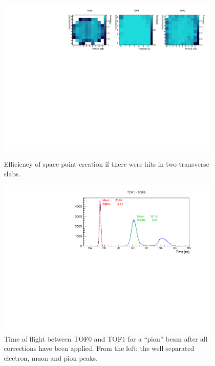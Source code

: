 \begin{figure}[!htb]
  \begin{center}
  \includegraphics[width=0.9\columnwidth]{08_sp_eff_by_pixel_2d} \\
  \caption{Efficiency of space point creation if there were hits in
    two transverse slabs.}
  \label{fig:SpEffByPixel}
  \end{center}
\end{figure}


\begin{figure}[!htb]
  \begin{center}
    \includegraphics[width=0.6\columnwidth]{TOF_peaks.pdf}
    \caption{Time of flight between TOF0 and TOF1 for a ``pion'' beam
      after all corrections have been applied. From the left: the well
      separated electron, muon and pion peaks.}
    \label{fig:TOF_peaks}
  \end{center}
\end{figure}




